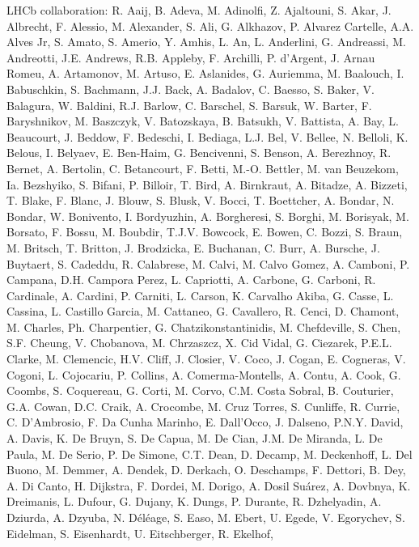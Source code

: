 LHCb collaboration: 
R. Aaij,
B. Adeva,
M. Adinolfi,
Z. Ajaltouni,
S. Akar,
J. Albrecht,
F. Alessio,
M. Alexander,
S. Ali,
G. Alkhazov,
P. Alvarez Cartelle,
A.A. Alves Jr,
S. Amato,
S. Amerio,
Y. Amhis,
L. An,
L. Anderlini,
G. Andreassi,
M. Andreotti,
J.E. Andrews,
R.B. Appleby,
F. Archilli,
P. d'Argent,
J. Arnau Romeu,
A. Artamonov,
M. Artuso,
E. Aslanides,
G. Auriemma,
M. Baalouch,
I. Babuschkin,
S. Bachmann,
J.J. Back,
A. Badalov,
C. Baesso,
S. Baker,
V. Balagura,
W. Baldini,
R.J. Barlow,
C. Barschel,
S. Barsuk,
W. Barter,
F. Baryshnikov,
M. Baszczyk,
V. Batozskaya,
B. Batsukh,
V. Battista,
A. Bay,
L. Beaucourt,
J. Beddow,
F. Bedeschi,
I. Bediaga,
L.J. Bel,
V. Bellee,
N. Belloli,
K. Belous,
I. Belyaev,
E. Ben-Haim,
G. Bencivenni,
S. Benson,
A. Berezhnoy,
R. Bernet,
A. Bertolin,
C. Betancourt,
F. Betti,
M.-O. Bettler,
M. van Beuzekom,
Ia. Bezshyiko,
S. Bifani,
P. Billoir,
T. Bird,
A. Birnkraut,
A. Bitadze,
A. Bizzeti,
T. Blake,
F. Blanc,
J. Blouw,
S. Blusk,
V. Bocci,
T. Boettcher,
A. Bondar,
N. Bondar,
W. Bonivento,
I. Bordyuzhin,
A. Borgheresi,
S. Borghi,
M. Borisyak,
M. Borsato,
F. Bossu,
M. Boubdir,
T.J.V. Bowcock,
E. Bowen,
C. Bozzi,
S. Braun,
M. Britsch,
T. Britton,
J. Brodzicka,
E. Buchanan,
C. Burr,
A. Bursche,
J. Buytaert,
S. Cadeddu,
R. Calabrese,
M. Calvi,
M. Calvo Gomez,
A. Camboni,
P. Campana,
D.H. Campora Perez,
L. Capriotti,
A. Carbone,
G. Carboni,
R. Cardinale,
A. Cardini,
P. Carniti,
L. Carson,
K. Carvalho Akiba,
G. Casse,
L. Cassina,
L. Castillo Garcia,
M. Cattaneo,
G. Cavallero,
R. Cenci,
D. Chamont,
M. Charles,
Ph. Charpentier,
G. Chatzikonstantinidis,
M. Chefdeville,
S. Chen,
S.F. Cheung,
V. Chobanova,
M. Chrzaszcz,
X. Cid Vidal,
G. Ciezarek,
P.E.L. Clarke,
M. Clemencic,
H.V. Cliff,
J. Closier,
V. Coco,
J. Cogan,
E. Cogneras,
V. Cogoni,
L. Cojocariu,
P. Collins,
A. Comerma-Montells,
A. Contu,
A. Cook,
G. Coombs,
S. Coquereau,
G. Corti,
M. Corvo,
C.M. Costa Sobral,
B. Couturier,
G.A. Cowan,
D.C. Craik,
A. Crocombe,
M. Cruz Torres,
S. Cunliffe,
R. Currie,
C. D'Ambrosio,
F. Da Cunha Marinho,
E. Dall'Occo,
J. Dalseno,
P.N.Y. David,
A. Davis,
K. De Bruyn,
S. De Capua,
M. De Cian,
J.M. De Miranda,
L. De Paula,
M. De Serio,
P. De Simone,
C.T. Dean,
D. Decamp,
M. Deckenhoff,
L. Del Buono,
M. Demmer,
A. Dendek,
D. Derkach,
O. Deschamps,
F. Dettori,
B. Dey,
A. Di Canto,
H. Dijkstra,
F. Dordei,
M. Dorigo,
A. Dosil Su{\'a}rez,
A. Dovbnya,
K. Dreimanis,
L. Dufour,
G. Dujany,
K. Dungs,
P. Durante,
R. Dzhelyadin,
A. Dziurda,
A. Dzyuba,
N. D{\'e}l{\'e}age,
S. Easo,
M. Ebert,
U. Egede,
V. Egorychev,
S. Eidelman,
S. Eisenhardt,
U. Eitschberger,
R. Ekelhof,
